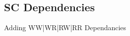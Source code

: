 \documentclass[notes xcolor=dvipsnames]{beamer}
\begin{document}
    \subsection{SC Dependencies}
    \begin{frame}{Adding WW|WR|RW|RR Dependancies}

        \begin{figure}
        \end{figure}

        \begin{columns}
            
            \begin{column}{0.5\textwidth}

                \begin{figure}
                \end{figure}
                
            \end{column}

            \begin{column}{0.5\textwidth}
                
                \begin{figure}
                \end{figure}

            \end{column}

        \end{columns}
        
    \end{frame}
\end{document}
